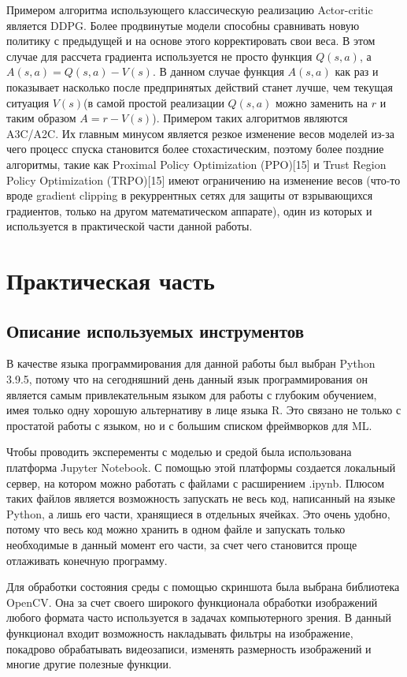 \documentclass[bachelor, och, coursework]{shiza}
\begin{document}
Примером алгоритма использующего классическую реализацию Actor-critic является DDPG. Более продвинутые модели способны сравнивать новую политику с предыдущей
и на основе этого корректировать свои веса. В этом случае для рассчета градиента используется не просто функция $Q(s,a)$, а $A(s,a) = Q(s,a) - V(s)$. В данном случае
функция $A(s, a)$ как раз и показывает насколько после предпринятых действий станет лучше, чем текущая ситуация $V(s)$(в самой простой реализации $Q(s,a)$ можно
заменить на $r$ и таким образом $A = r - V(s)$). Примером таких алгоритмов являются A3C/A2C. Их главным минусом является резкое изменение весов моделей из-за чего
процесс спуска становится более стохастическим, поэтому более поздние алгоритмы, такие как Proximal Policy Optimization (PPO)[15] и Trust Region Policy Optimization (TRPO)[15]
имеют ограничению на изменение весов (что-то вроде gradient clipping в рекуррентных сетях для защиты от взрывающихся градиентов, только на другом математическом аппарате),
один из которых и используется в практической части данной работы.

\section{Практическая часть}
\subsection{Описание используемых инструментов}
В качестве языка программирования для данной работы был выбран Python 3.9.5, потому что на сегодняшний день данный язык программирования он является самым привлекательным
языком для работы с глубоким обучением, имея только одну хорошую альтернативу в лице языка R. Это связано не только с простатой работы с языком, но и с большим списком
фреймворков для ML.

Чтобы проводить эксперементы с моделью и средой была использована платформа Jupyter Notebook. С помощью этой платформы создается локальный сервер, на котором можно работать
с файлами с расширением .ipynb. Плюсом таких файлов является возможность запускать не весь код, написанный на языке Python, а лишь его части, хранящиеся в отдельных ячейках.
Это очень удобно, потому что весь код можно хранить в одном файле и запускать только необходимые в данный момент его части, за счет чего становится проще отлаживать конечную программу.

Для обработки состояния среды с помощью скриншота была выбрана библиотека OpenCV. Она за счет своего широкого функционала обработки изображений любого формата часто используется
в задачах компьютерного зрения. В данный функционал входит возможность накладывать фильтры на изображение, покадрово обрабатывать видеозаписи, изменять размерность изображений и
многие другие полезные функции.
\end{document}
